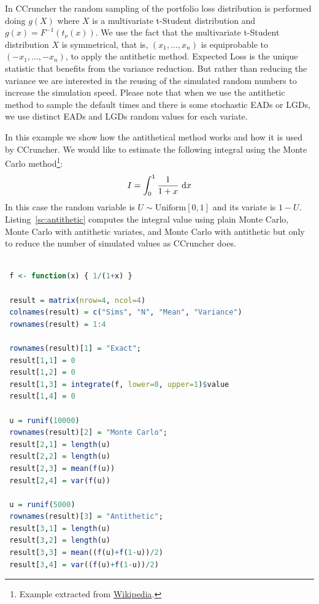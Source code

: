 \documentclass[11pt,fleqn]{book} %
\begin{document}
In CCruncher the random sampling of the portfolio loss distribution is 
performed doing $g(X)$ where $X$ is a multivariate t-Student distribution 
and $g(x) = F^{-1}(t_{\nu}(x))$. We use the fact that the multivariate 
t-Student distribution $X$ is symmetrical, that is, $(x_1,\dots,x_n)$ is 
equiprobable to $(-x_1,\dots,-x_n)$, to apply the antithetic method. 
Expected Loss is the unique statistic that benefits from the variance 
reduction. But rather than reducing the variance we are interested 
in the reusing of the simulated random numbers to increase the simulation 
speed. Please note that when we use the antithetic method to sample the 
default times and there is some stochastic EADs or LGDs, we use distinct 
EADs and LGDs random values for each variate.

\begin{example}
	In this example we show how the antithetical method works and how it 
	is used by CCruncher. We would like to estimate the following integral 
	using the Monte Carlo method\footnote{Example extracted from 
	\href{http://en.wikipedia.org/wiki/Antithetic_variates}{Wikipedia}.}:
	\begin{displaymath}
	I = \displaystyle \int_0^1 \frac{1}{1+x} \mathop{\,\mathrm{{}d}}\mathopen{} x
	\end{displaymath}
	In this case the random variable is $U \sim \text{Uniform}[0,1]$ and its variate 
	is $1-U$. Listing~\ref{sc:antithetic} computes the integral value using plain Monte 
	Carlo, Monte Carlo with antithetic variates, and Monte Carlo with antithetic but only
	to reduce the number of simulated values as CCruncher does.

	\begin{lstlisting}[language=R, label=sc:antithetic, caption=Antithetic example (R script)]

 f <- function(x) { 1/(1+x) }
 
 result = matrix(nrow=4, ncol=4)
 colnames(result) = c("Sims", "N", "Mean", "Variance")
 rownames(result) = 1:4

 rownames(result)[1] = "Exact";
 result[1,1] = 0
 result[1,2] = 0
 result[1,3] = integrate(f, lower=0, upper=1)$value
 result[1,4] = 0

 u = runif(10000)
 rownames(result)[2] = "Monte Carlo";
 result[2,1] = length(u)
 result[2,2] = length(u)
 result[2,3] = mean(f(u))
 result[2,4] = var(f(u))

 u = runif(5000)
 rownames(result)[3] = "Antithetic";
 result[3,1] = length(u)
 result[3,2] = length(u)
 result[3,3] = mean((f(u)+f(1-u))/2)
 result[3,4] = var((f(u)+f(1-u))/2)


\end{lstlisting}
\end{example}
\end{document}
